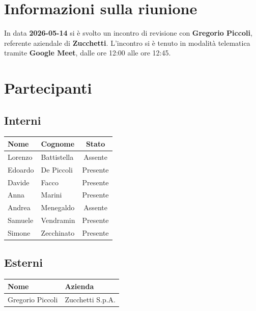 \documentclass[a4paper, 10pt, colorlinks=true, linkcolor=black, urlcolor=blue, citecolor=blue, hidelinks]{article}
\newcommand{\dataverbale}{2026-05-14}
\begin{document}
\begin{titlepage}

\end{titlepage}

\newpage

\pagestyle{fancy} 

\tableofcontents 

\newpage
{}

\section{Informazioni sulla riunione}
In data \textbf{\dataverbale} si è svolto un incontro di revisione con \textbf{Gregorio Piccoli}, referente aziendale di \textbf{Zucchetti}. L'incontro si è tenuto in modalità telematica tramite \textbf{Google Meet}, dalle ore 12:00 alle ore 12:45.

\section{Partecipanti}

\subsection{Interni}
\begin{center}
\begin{tabular}{|l|l|c|}
\hline
\textbf{Nome} & \textbf{Cognome} & \textbf{Stato} \\
\hline
Lorenzo & Battistella & Assente \\
Edoardo & De Piccoli & Presente \\
Davide & Facco & Presente \\
Anna & Marini & Presente \\
Andrea & Menegaldo & Assente \\
Samuele & Vendramin & Presente \\
Simone & Zecchinato & Presente \\
\hline
\end{tabular}
\end{center}

\subsection{Esterni}
\begin{center}
\begin{tabular}{|l|l|}
\hline
\textbf{Nome} & \textbf{Azienda} \\
\hline
Gregorio Piccoli & Zucchetti S.p.A. \\
\hline
\end{tabular}
\end{center}
\end{document}
